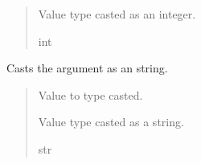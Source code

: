 \documentclass[letterpaper,10pt,english]{sphinxmanual}
\begin{document}
\begin{fulllineitems}
\begin{fulllineitems}
\begin{quote}
\begin{description}
\sphinxAtStartPar
Value type casted as an integer.

\sphinxAtStartPar
int

\end{description}\end{quote}

\end{fulllineitems}


\begin{fulllineitems}
\label{\detokenize{Setup.Inputs:Setup.Inputs.GetUserInput.UserInput.CastStr}}
\pysigstartsignatures
{}
\pysigstopsignatures
\sphinxAtStartPar
Casts the argument as an string.
\begin{quote}\begin{description}
\sphinxAtStartPar
{} \textendash{} Value to type casted.

\sphinxAtStartPar
Value type casted as a string.

\sphinxAtStartPar
str

\end{description}\end{quote}

\end{fulllineitems}



\end{fulllineitems}
\end{document}
